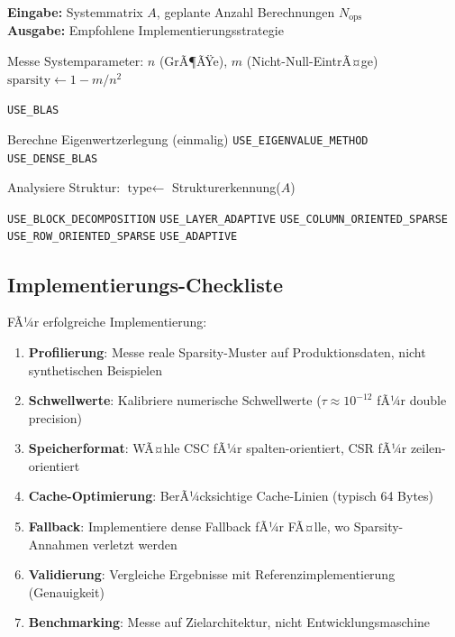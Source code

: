 ﻿\documentclass[a4paper,12pt]{report}
\theoremstyle{definition}
\begin{document}
	\begin{algorithm}[H]
		\caption{Strategie-Auswahl fÃ¼r Matrix-basierte Systeme}
		\label{alg:final-decision-tree}
		\textbf{Eingabe:} Systemmatrix $A$, geplante Anzahl Berechnungen $N_{\text{ops}}$ \\
		\textbf{Ausgabe:} Empfohlene Implementierungsstrategie
		\begin{algorithmic}[1]
			\State Messe Systemparameter: $n$ (GrÃ¶ÃŸe), $m$ (Nicht-Null-EintrÃ¤ge)
			\State $\text{sparsity} \gets 1 - m/n^2$
			
			\State \Return \texttt{USE\_BLAS} 
			\EndIf
			
			\State Berechne Eigenwertzerlegung (einmalig)
			\State \Return \texttt{USE\_EIGENVALUE\_METHOD}
			\Else
			\State \Return \texttt{USE\_DENSE\_BLAS}
			\EndIf
			\EndIf
			
			\State Analysiere Struktur: $\text{type} \gets $ Strukturerkennung($A$)
			
			\State \Return \texttt{USE\_BLOCK\_DECOMPOSITION}
			\State \Return \texttt{USE\_LAYER\_ADAPTIVE}
			\State \Return \texttt{USE\_COLUMN\_ORIENTED\_SPARSE}
			\Else
			\State \Return \texttt{USE\_ROW\_ORIENTED\_SPARSE}
			\EndIf
			\Else
			\State \Return \texttt{USE\_ADAPTIVE} 
			\EndIf
		\end{algorithmic}
	\end{algorithm}
	
	\subsection{Implementierungs-Checkliste}
	
	FÃ¼r erfolgreiche Implementierung:
	
	\begin{enumerate}
		\item \textbf{Profilierung}: Messe reale Sparsity-Muster auf Produktionsdaten, nicht synthetischen Beispielen
		\item \textbf{Schwellwerte}: Kalibriere numerische Schwellwerte ($\tau \approx 10^{-12}$ fÃ¼r double precision)
		\item \textbf{Speicherformat}: WÃ¤hle CSC fÃ¼r spalten-orientiert, CSR fÃ¼r zeilen-orientiert
		\item \textbf{Cache-Optimierung}: BerÃ¼cksichtige Cache-Linien (typisch 64 Bytes)
		\item \textbf{Fallback}: Implementiere dense Fallback fÃ¼r FÃ¤lle, wo Sparsity-Annahmen verletzt werden
		\item \textbf{Validierung}: Vergleiche Ergebnisse mit Referenzimplementierung (Genauigkeit)
		\item \textbf{Benchmarking}: Messe auf Zielarchitektur, nicht Entwicklungsmaschine
	\end{enumerate}
	
\end{document}
